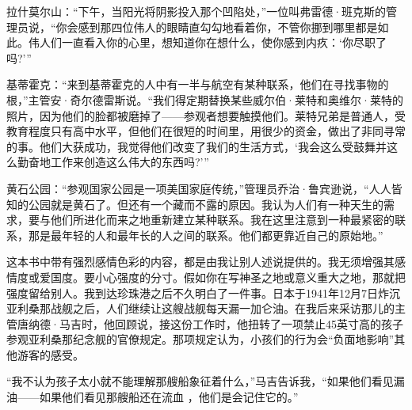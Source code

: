 拉什莫尔山：“下午，当阳光将阴影投入那个凹陷处，”一位叫弗雷德·班克斯的管理员说，“你会感到那四位伟人的眼睛直勾勾地看着你，不管你挪到哪里都是如此。伟人们一直看入你的心里，想知道你在想什么，使你感到内疚：‘你尽职了吗?’”

基蒂霍克：“来到基蒂霍克的人中有一半与航空有某种联系，他们在寻找事物的根，”主管安·奇尔德雷斯说。“我们得定期替换某些威尔伯·莱特和奥维尔·莱特的照片，因为他们的脸都被磨掉了——参观者想要触摸他们。莱特兄弟是普通人，受教育程度只有高中水平，但他们在很短的时间里，用很少的资金，做出了非同寻常的事。他们大获成功，我觉得他们改变了我们的生活方式，‘我会这么受鼓舞并这么勤奋地工作来创造这么伟大的东西吗?’”

黄石公园：“参观国家公园是一项美国家庭传统，”管理员乔治·鲁宾逊说，“人人皆知的公园就是黄石了。但还有一个藏而不露的原因。我认为人们有一种天生的需求，要与他们所进化而来之地重新建立某种联系。我在这里注意到一种最紧密的联系，那是最年轻的人和最年长的人之间的联系。他们都更靠近自己的原始地。”

这本书中带有强烈感情色彩的内容，都是由我让别人述说提供的。我无须增强其感情度或爱国度。要小心强度的分寸。假如你在写神圣之地或意义重大之地，那就把强度留给别人。我到达珍珠港之后不久明白了一件事。日本于1941年12月7日炸沉亚利桑那战舰之后，人们继续让这艘战舰每天漏一加仑油。在我后来采访那儿的主管唐纳德·马吉时，他回顾说，接这份工作时，他扭转了一项禁止45英寸高的孩子参观亚利桑那纪念舰的官僚规定。那项规定认为，小孩们的行为会“负面地影响”其他游客的感受。

“我不认为孩子太小就不能理解那艘船象征着什么，”马吉告诉我，“如果他们看见漏油——如果他们看见那艘船还在流血 ，他们是会记住它的。”